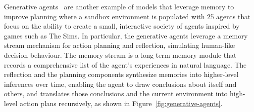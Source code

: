 Generative agents~\cite{park2023generativeagentsinteractivesimulacra} are another example of models that leverage memory to improve planning where a sandbox environment is populated with 25 agents that focus on the ability to create a small, interactive society of agents inspired by games such as The Sims.
In particular, the generative agents leverage a memory stream mechanism for action planning and reflection, simulating human-like decision behaviour.
The memory stream is a long-term memory module that records a comprehensive list of the agent’s experiences in natural language.
The reflection and the planning components synthesize memories into higher-level inferences over time, enabling the agent to draw conclusions
about itself and others, and translates those conclusions and the current environment into high-level action plans recursively, as shown in Figure~\ref{fig:generative-agents}.

